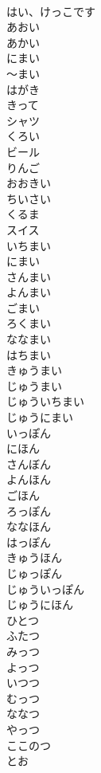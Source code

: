 \documentclass[8pt]{extreport}
\begin{document}
\begin{CJK}{UTF8}{min}
\\	はい、けっこです		
\\	あおい		
\\	あかい		
\\	にまい		
\\	〜まい		
\\	はがき		
\\	きって		
\\	シャツ		
\\	くろい		
\\	ビール		
\\	りんご		
\\	おおきい		
\\	ちいさい		
\\	くるま		
\\	スイス		
\\	いちまい		
\\	にまい		
\\	さんまい		
\\	よんまい		
\\	ごまい		
\\	ろくまい		
\\	ななまい		
\\	はちまい		
\\	きゅうまい		
\\	じゅうまい		
\\	じゅういちまい		
\\	じゅうにまい		
\\	いっぽん		
\\	にほん		
\\	さんぼん		
\\	よんほん		
\\	ごほん		
\\	ろっぽん		
\\	ななほん		
\\	はっぽん		
\\	きゅうほん		
\\	じゅっぽん		
\\	じゅういっぽん		
\\	じゅうにほん		
\\	ひとつ		
\\	ふたつ		
\\	みっつ		
\\	よっつ		
\\	いつつ		
\\	むっつ		
\\	ななつ		
\\	やっつ		
\\	ここのつ		
\\	とお		

\end{CJK}
\end{document}

